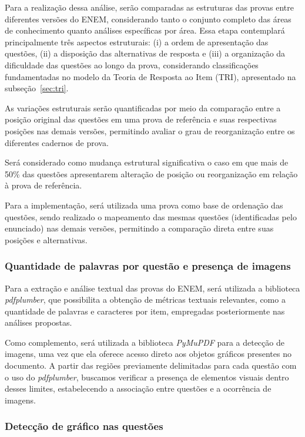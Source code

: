 \documentclass[a4paper,10pt, twocolumn]{article}
\begin{document}
Para a realização dessa análise, serão comparadas as estruturas das provas entre diferentes versões do ENEM, considerando tanto o conjunto completo das áreas de conhecimento quanto análises específicas por área. Essa etapa contemplará principalmente três aspectos estruturais: (i) a ordem de apresentação das questões, (ii) a disposição das alternativas de resposta e (iii) a organização da dificuldade das questões ao longo da prova, considerando classificações fundamentadas no modelo da Teoria de Resposta ao Item (TRI), apresentado na subseção~\ref{sec:tri}.

As variações estruturais serão quantificadas por meio da comparação entre a posição original das questões em uma prova de referência e suas respectivas posições nas demais versões, permitindo avaliar o grau de reorganização entre os diferentes cadernos de prova.

Será considerado como mudança estrutural significativa o caso em que mais de 50\% das questões apresentarem alteração de posição ou reorganização em relação à prova de referência.

Para a implementação, será utilizada uma prova como base de ordenação das questões, sendo realizado o mapeamento das mesmas questões (identificadas pelo enunciado) nas demais versões, permitindo a comparação direta entre suas posições e alternativas.
\subsubsection{Quantidade de palavras por questão e presença de imagens} 

Para a extração e análise textual das provas do ENEM, será utilizada a biblioteca \textit{pdfplumber}, que possibilita a obtenção de métricas textuais relevantes, como a quantidade de palavras e caracteres por item, empregadas posteriormente nas análises propostas.

Como complemento, será utilizada a biblioteca \textit{PyMuPDF} para a detecção de imagens, uma vez que ela oferece acesso direto aos objetos gráficos presentes no documento. A partir das regiões previamente delimitadas para cada questão com o uso do \textit{pdfplumber}, buscamos verificar a presença de elementos visuais dentro desses limites, estabelecendo a associação entre questões e a ocorrência de imagens.

\subsubsection{Detecção de gráfico nas questões}
\end{document}
